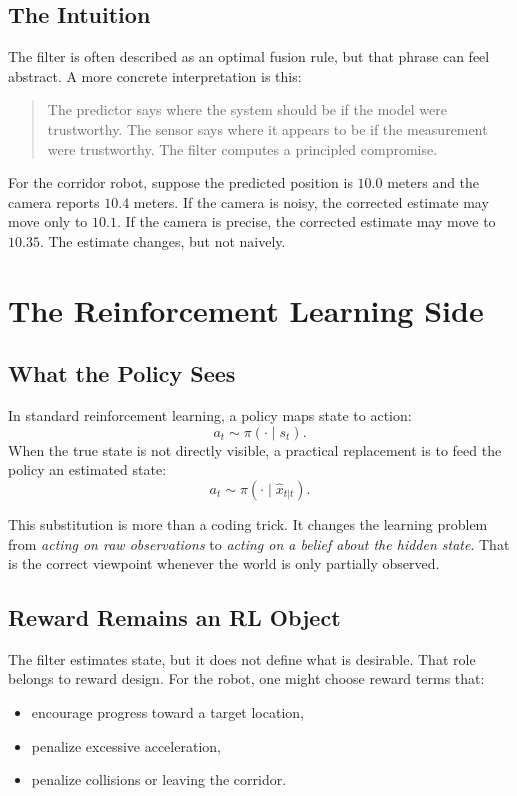 \documentclass[12pt,a4paper]{article}
\begin{document}
\subsection{The Intuition}

The filter is often described as an optimal fusion rule, but that phrase can feel abstract. A more concrete interpretation is this:

\begin{quote}
The predictor says where the system should be if the model were trustworthy. The sensor says where it appears to be if the measurement were trustworthy. The filter computes a principled compromise.
\end{quote}

For the corridor robot, suppose the predicted position is \(10.0\) meters and the camera reports \(10.4\) meters. If the camera is noisy, the corrected estimate may move only to \(10.1\). If the camera is precise, the corrected estimate may move to \(10.35\). The estimate changes, but not naively.

\section{The Reinforcement Learning Side}

\subsection{What the Policy Sees}

In standard reinforcement learning, a policy maps state to action:
\[
a_t \sim \pi(\cdot \mid s_t).
\]
When the true state is not directly visible, a practical replacement is to feed the policy an estimated state:
\[
a_t \sim \pi(\cdot \mid \hat{x}_{t|t}).
\]

This substitution is more than a coding trick. It changes the learning problem from
\emph{acting on raw observations}
to
\emph{acting on a belief about the hidden state}.
That is the correct viewpoint whenever the world is only partially observed.

\subsection{Reward Remains an RL Object}

The filter estimates state, but it does not define what is desirable. That role belongs to reward design. For the robot, one might choose reward terms that:
\begin{itemize}
  \item encourage progress toward a target location,
  \item penalize excessive acceleration,
  \item penalize collisions or leaving the corridor.
\end{itemize}
\end{document}

